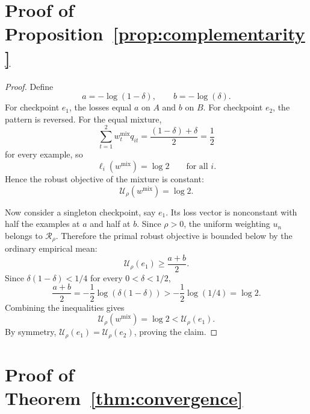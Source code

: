 \documentclass{article}
\newcommand{\cR}{\mathcal{R}}
\begin{document}
\section{Proof of Proposition~\ref{prop:complementarity}}

\begin{proof}
Define
\[
    a=-\log(1-\delta), \qquad b=-\log(\delta).
\]
For checkpoint $e_1$, the losses equal $a$ on $A$ and $b$ on $B$. For checkpoint $e_2$, the pattern is reversed. For the equal mixture,
\[
    \sum_{t=1}^{2} w_t^{\mathrm{mix}} q_{it}
    =
    \frac{(1-\delta)+\delta}{2}
    =
    \frac{1}{2}
\]
for every example, so
\[
    \ell_i(w^{\mathrm{mix}})=\log 2
    \qquad \text{for all } i.
\]
Hence the robust objective of the mixture is constant:
\[
    \mathcal U_{\rho}(w^{\mathrm{mix}})=\log 2.
\]

Now consider a singleton checkpoint, say $e_1$. Its loss vector is nonconstant with half the examples at $a$ and half at $b$. Since $\rho>0$, the uniform weighting $u_n$ belongs to $\cR_{\rho}$. Therefore the primal robust objective is bounded below by the ordinary empirical mean:
\[
    \mathcal U_{\rho}(e_1)
    \ge
    \frac{a+b}{2}.
\]
Since $\delta(1-\delta)<1/4$ for every $0<\delta<1/2$,
\[
    \frac{a+b}{2}
    =
    -\frac{1}{2}\log(\delta(1-\delta))
    >
    -\frac{1}{2}\log(1/4)
    =
    \log 2.
\]
Combining the inequalities gives
\[
    \mathcal U_{\rho}(w^{\mathrm{mix}})
    =
    \log 2
    <
    \mathcal U_{\rho}(e_1).
\]
By symmetry, $\mathcal U_{\rho}(e_1)=\mathcal U_{\rho}(e_2)$, proving the claim.
\end{proof}

\section{Proof of Theorem~\ref{thm:convergence}}
\end{document}
